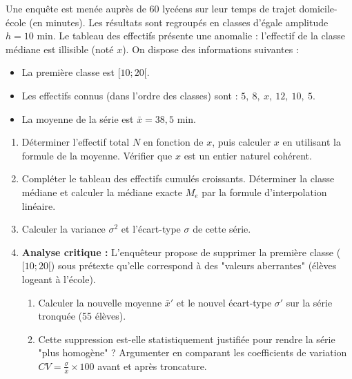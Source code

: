 \documentclass[11pt]{article}
\begin{document}
\begin{exercice}
Une enquête est menée auprès de 60 lycéens sur leur temps de trajet domicile-école (en minutes). Les résultats sont regroupés en classes d'égale amplitude $h=10$ min. Le tableau des effectifs présente une anomalie : l'effectif de la classe médiane est illisible (noté $x$). On dispose des informations suivantes :
\begin{itemize}
    \item La première classe est $[10; 20[$.
    \item Les effectifs connus (dans l'ordre des classes) sont : $5,\ 8,\ x,\ 12,\ 10,\ 5$.
    \item La moyenne de la série est $\bar{x} = 38,5$ min.
\end{itemize}
\begin{enumerate}
    \item Déterminer l'effectif total $N$ en fonction de $x$, puis calculer $x$ en utilisant la formule de la moyenne. Vérifier que $x$ est un entier naturel cohérent.
    \item Compléter le tableau des effectifs cumulés croissants. Déterminer la classe médiane et calculer la médiane exacte $M_e$ par la formule d'interpolation linéaire.
    \item Calculer la variance $\sigma^2$ et l'écart-type $\sigma$ de cette série.
    \item \textbf{Analyse critique :} L'enquêteur propose de supprimer la première classe ($[10;20[$) sous prétexte qu'elle correspond à des "valeurs aberrantes" (élèves logeant à l'école).
    \begin{enumerate}
        \item Calculer la nouvelle moyenne $\bar{x}'$ et le nouvel écart-type $\sigma'$ sur la série tronquée (55 élèves).
        \item Cette suppression est-elle statistiquement justifiée pour rendre la série "plus homogène" ? Argumenter en comparant les coefficients de variation $CV = \frac{\sigma}{\bar{x}} \times 100$ avant et après troncature.
    \end{enumerate}
\end{enumerate}
\end{exercice}
\end{document}
